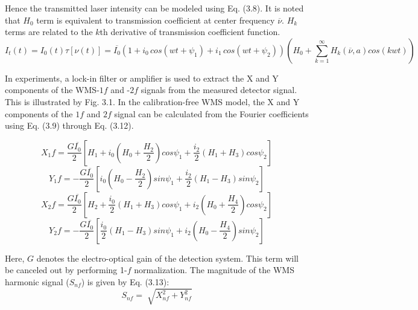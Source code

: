 Hence the transmitted laser intensity can be modeled using Eq. (3.8). It is noted that $H_0$ term is equivalent to transmission coefficient at center frequency $\overline{\nu}$. $H_k$ terms are related to the $k$th derivative of transmission coefficient function.  
\begin{equation}
I_t(t)=I_0(t)\tau[\nu(t)]=\overline{I_0}(1+i_0\,cos(wt+\psi_1)+i_1\,cos(wt+\psi_2))(H_0+\sum_{k=1}^{\infty}H_k(\overline{\nu},a)cos(kwt))
\end{equation}

In experiments, a lock-in filter or amplifier is used to extract the X and Y components of the WMS-$1f$ and -$2f$ signals from the measured detector signal. This is illustrated by Fig. 3.1. In the calibration-free WMS model, the X and Y components of the $1f$ and $2f$ signal can be calculated from the Fourier coefficients using Eq. (3.9) through Eq. (3.12).

\begin{equation}
X_1f=\frac{G\overline{I_0}}{2}[H_1+i_0(H_0+\frac{H_2}{2})cos\psi_1+\frac{i_2}{2}(H_1+H_3)cos\psi_2]
\end{equation}
\begin{equation}
Y_1f=-\frac{G\overline{I_0}}{2}[i_0(H_0-\frac{H_2}{2})sin\psi_1+\frac{i_2}{2}(H_1-H_3)sin\psi_2]
\end{equation}
\begin{equation}
X_2f=\frac{G\overline{I_0}}{2}[H_2+\frac{i_0}{2}(H_1+H_3)cos\psi_1+i_2(H_0+\frac{H_4}{2})cos\psi_2]
\end{equation}
\begin{equation}
Y_2f=-\frac{G\overline{I_0}}{2}[\frac{i_0}{2}(H_1-H_3)sin\psi_1+i_2(H_0-\frac{H_4}{2})sin\psi_2]
\end{equation}

\noindent Here, $G$ denotes the electro-optical gain of the detection system. This term will be canceled out by performing 1-$f$ normalization. The magnitude of the WMS harmonic signal ($S_{nf}$) is given by Eq. (3.13):
\begin{equation}
S_{nf}=\sqrt[]{X_{nf}^2+Y_{nf}^2}
\end{equation}

